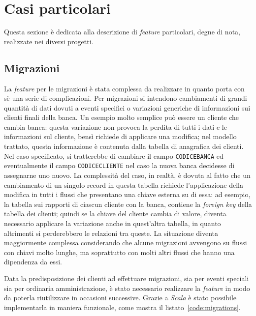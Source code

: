 \section{Casi particolari}\label{sec:features}
Questa sezione è dedicata alla descrizione di \textit{feature} particolari, degne di nota, realizzate nei diversi progetti.

\subsection{Migrazioni}\label{subsec:migrations}
La \textit{feature} per le migrazioni è stata complessa da realizzare in quanto porta con sè una serie di complicazioni.
Per migrazioni si intendono cambiamenti di grandi quantità di dati dovuti a eventi specifici o variazioni generiche di informazioni sui clienti finali della banca.
Un esempio molto semplice può essere un cliente che cambia banca:
questa variazione non provoca la perdita di tutti i dati e le informazioni sul cliente, bensì richiede di applicare una modifica;
nel modello trattato, questa informazione è contenuta dalla tabella di anagrafica dei clienti.
Nel caso specificato, si tratterebbe di cambiare il campo \texttt{CODICEBANCA} ed eventualmente il campo \texttt{CODICECLIENTE} nel caso la nuova banca decidesse di assegnarne uno nuovo.
La complessità del caso, in realtà, è dovuta al fatto che un cambiamento di un singolo record in questa tabella richiede l'applicazione della modifica in tutti i flussi che presentano una chiave esterna su di essa:
ad esempio, la tabella sui rapporti di ciascun cliente con la banca, contiene la \textit{foreign key} della tabella dei clienti;
quindi se la chiave del cliente cambia di valore, diventa necessario applicare la variazione anche in quest'altra tabella, in quanto altrimenti si perderebbero le relazioni tra queste.
La situazione diventa maggiormente complessa considerando che alcune migrazioni avvengono su flussi con chiavi molto lunghe, ma soprattutto con molti altri flussi che hanno una dipendenza da essi.

Data la predisposizione dei clienti ad effettuare migrazioni, sia per eventi speciali sia per ordinaria amministrazione, è stato necessario realizzare la \textit{feature} in modo da poterla riutilizzare in occasioni successive.
Grazie a \textit{Scala} è stato possibile implementarla in maniera funzionale, come mostra il listato~\ref{code:migrations}.



